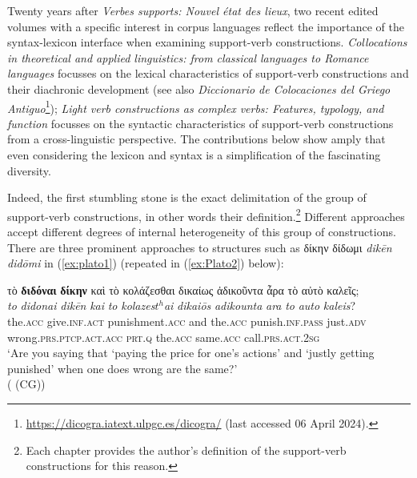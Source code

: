 \documentclass[output=paper,colorlinks,citecolor=brown]{langscibook}
\begin{document}
Twenty years after \citet{GrossPontonx2004} \textit{Verbes supports: Nouvel état des lieux}, two recent edited volumes with a specific interest in corpus languages reflect the importance of the syntax-lexicon interface when examining support-verb constructions. \citet{banosCollocationsTheoreticalApplied2022} \textit{Collocations in theoretical and applied linguistics: from classical languages to Romance languages} focusses on the lexical characteristics of support-verb constructions and their diachronic development (see also \textit{Diccionario de Colocaciones del Griego Antiguo}\footnote{\url{https://dicogra.iatext.ulpgc.es/dicogra/} (last accessed 06 April 2024).}); \citet{PompeiPiunno2023} \textit{Light verb constructions as complex verbs: Features, typology, and function} focusses on the syntactic characteristics of support-verb constructions from a cross-linguistic perspective. The contributions below show amply that even considering the lexicon and syntax is a simplification of the fascinating diversity. 


Indeed, the first stumbling stone is the exact delimitation of the group of support-verb constructions, in other words their definition.\footnote{Each chapter provides the author's definition of the support-verb constructions for this reason.} Different approaches accept different degrees of internal heterogeneity of this group of constructions. There are three prominent approaches to structures such as δίκην δίδωμι \textit{dikēn didōmi} in (\ref{ex:plato1}) (repeated in (\ref{ex:Plato2}) below): 

\ea\label{ex:plato1}
\glll τὸ \textbf{διδόναι} \textbf{δίκην} καὶ τὸ κολάζεσθαι δικαίως ἀδικοῦντα ἆρα τὸ αὐτὸ καλεῖς; \\ \textit{to} 		\textit{didonai} 	\textit{dikēn} 			\textit{kai} 	\textit{to} \textit{kolazes$t^{h}$ai} 		\textit{dikaiōs} 	\textit{adikounta} 		   \textit{ara} 		\textit{to} \textit{auto} 		         \textit{kaleis}? \\ the.\textsc{acc} 	give.\textsc{inf.act} punishment.\textsc{acc}  and 	the.\textsc{acc} punish.\textsc{inf.pass} 	just.\textsc{adv} 	wrong.\textsc{prs.ptcp.act.acc}  \textsc{prt}.\textsc{q}	the.\textsc{acc} same.\textsc{acc} 	 call.\textsc{prs.act.2sg}\\
\glt `Are you saying that ‘paying the price for one’s actions’ and ‘justly getting punished’ when one does wrong are the same?' \\
\hspace*{\fill}( (CG))
\z
\end{document}
